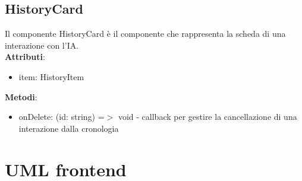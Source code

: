 \documentclass[11pt,a4paper]{article}
\begin{document}
\subsection{HistoryCard}
Il componente HistoryCard è il componente che rappresenta la scheda di una interazione con l'IA.\\

\textbf{Attributi}:
\begin{itemize}
    \item item: HistoryItem
\end{itemize}

\textbf{Metodi}:
\begin{itemize}
    \item onDelete: (id: string) =$>$ void - callback per gestire la cancellazione di una interazione dalla cronologia
\end{itemize}

\section{UML frontend}
\end{document}
